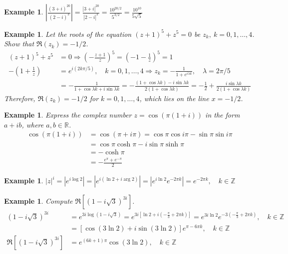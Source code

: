 \documentclass{article}
\newtheorem{example}[theorem]{Example}
\theoremstyle{definition}
\begin{document}
\begin{example} \normalfont
    $\left| \frac{(3+i)^{20}}{(2-i)^3} \right| = \frac{|3+i|^{20}}{|2-i|^3} = \frac{10^{20/2}}{5^{3/2}} = \frac{10^{10}}{5 \sqrt{5}}$
\end{example}

\begin{example} \normalfont
    Let the roots of the equation $(z+1)^5 + z^5 = 0$ be $z_k,\ k = 0, 1, \dots, 4$. Show that $\Re (z_k) = -1/2$.
    \begin{align*}
        (z+1)^5 + z^5 &= 0 \Longrightarrow \left( -\frac{z+1}{z} \right)^5 = \left( -1 - \frac{1}{z} \right)^5 = 1 \\
        -\left( 1 + \frac{1}{z} \right) &= e^{i (2k\pi/5)}, \quad k = 0, 1, \dots, 4 \Longrightarrow z_k = -\frac{1}{1 + e^{i \lambda k}}, \quad \lambda = 2\pi/5 \\
        &= -\frac{1}{1 + \cos \lambda k + i \sin \lambda k} = -\frac{(1+\cos\lambda k) - i \sin \lambda k}{2(1 + \cos \lambda k)} = -\frac{1}{2} + \frac{i \sin \lambda k}{2 (1 + \cos \lambda k)}
    \end{align*}
    Therefore, $\Re (z_k) = -1/2$ for $k = 0, 1, \dots, 4$, which lies on the line $x = -1/2$.
\end{example}

\begin{example} \normalfont
    Express the complex number $z = \cos (\pi(1+i))$ in the form $a+ib$, where $a, b \in \mathbb{R}$.
    \begin{align*}
        \cos(\pi (1+i)) &= \cos(\pi + i \pi) = \cos \pi \cos i \pi - \sin \pi \sin i \pi \\
        &= \cos \pi \cosh \pi - i \sin \pi \sinh \pi \\
        &= -\cosh \pi \\
        &= -\frac{e^\pi + e^{-\pi}}{2}
    \end{align*}
\end{example}

\begin{example} \normalfont
    $|z|^i = |e^{i \log 2}| = |e^{i (\ln 2 + i \arg 2)}| = |e^{i \ln 2} e^{-2 \pi k}| = e^{-2 \pi k}, \quad k \in \mathbb{Z}$
\end{example}

\begin{example} \normalfont
    Compute $\Re \left[ (1-i \sqrt{3})^{3i} \right]$.
    \begin{align*}
        (1 - i \sqrt{3})^{3i} &= e^{3i \log(1 - i \sqrt{3})} = e^{3i \left[ \ln 2 + i \left( -\frac{\pi}{3} + 2 \pi k \right) \right]} = e^{3i \ln 2} e^{-3 \left( -\frac{\pi}{3} + 2 \pi k \right)}, \quad k \in \mathbb{Z} \\
        &= [\cos (3 \ln 2) + i \sin (3 \ln 2)] e^{\pi - 6 \pi k}, \quad k \in \mathbb{Z} \\
        \Re \left[ (1-i \sqrt{3})^{3i} \right] &= e^{(6k+1) \pi} \cos (3 \ln 2), \quad k \in \mathbb{Z}
    \end{align*}
\end{example}
\end{document}

